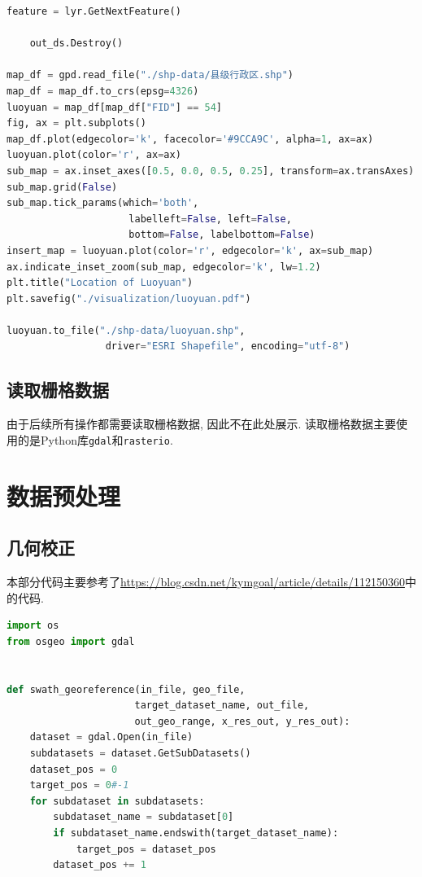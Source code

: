 \documentclass{ctexart}
\begin{document}
\begin{sloppypar}
\begin{appendices}
\begin{lstlisting}[frame=single, basicstyle={\ttfamily}, language = Python, caption={读取GDB并输出为shp}, label = {out}]
        feature = lyr.GetNextFeature()
    
    out_ds.Destroy()

map_df = gpd.read_file("./shp-data/县级行政区.shp")
map_df = map_df.to_crs(epsg=4326)
luoyuan = map_df[map_df["FID"] == 54]
fig, ax = plt.subplots()
map_df.plot(edgecolor='k', facecolor='#9CCA9C', alpha=1, ax=ax)
luoyuan.plot(color='r', ax=ax)
sub_map = ax.inset_axes([0.5, 0.0, 0.5, 0.25], transform=ax.transAxes)
sub_map.grid(False)
sub_map.tick_params(which='both',
                     labelleft=False, left=False,
                     bottom=False, labelbottom=False)
insert_map = luoyuan.plot(color='r', edgecolor='k', ax=sub_map)
ax.indicate_inset_zoom(sub_map, edgecolor='k', lw=1.2)
plt.title("Location of Luoyuan")
plt.savefig("./visualization/luoyuan.pdf")

luoyuan.to_file("./shp-data/luoyuan.shp",
                 driver="ESRI Shapefile", encoding="utf-8")

\end{lstlisting}
\subsection{读取栅格数据}
由于后续所有操作都需要读取栅格数据, 因此不在此处展示. 读取栅格数据主要使用的是Python库\verb|gdal|和\verb|rasterio|. 
\section{数据预处理}
\subsection{几何校正}\label{geom_corr}
本部分代码主要参考了\href{https://blog.csdn.net/kymgoal/article/details/112150360}{https://blog.csdn.net/kymgoal/article/details/112150360}中的代码.
\begin{lstlisting}[frame=single, language=Python,  basicstyle={\ttfamily}, caption={几何校正}, label=codegeom_corr]
import os
from osgeo import gdal


def swath_georeference(in_file, geo_file,
                      target_dataset_name, out_file,
                      out_geo_range, x_res_out, y_res_out):
    dataset = gdal.Open(in_file)
    subdatasets = dataset.GetSubDatasets()
    dataset_pos = 0
    target_pos = 0#-1
    for subdataset in subdatasets:
        subdataset_name = subdataset[0]
        if subdataset_name.endswith(target_dataset_name):
            target_pos = dataset_pos
        dataset_pos += 1
        

\end{lstlisting}
\end{appendices}
\end{sloppypar}
\end{document}
